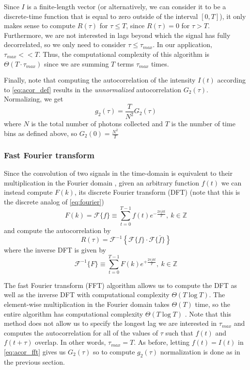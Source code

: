 Since $I$ is a finite-length vector (or alternatively, we can consider it to be a discrete-time function that is equal to zero outside of the interval $[0,T]$), it only makes sense to compute $R(\tau)$ for $\tau \leq T$, since $R(\tau) = 0$ for $\tau > T$. Furthermore, we are not interested in lags beyond which the signal has fully decorrelated, so we only need to consider $\tau \leq \tau_{max}$. In our application, $\tau_{max} << T$. Thus, the computational complexity of this algorithm is $\Theta(T\cdot\tau_{max})$ since we are summing $T$ terms $\tau_{max}$ times. 

Finally, note that computing the autocorrelation of the intensity $I(t)$ according to \autoref{eq:acor_def} results in the \emph{unnormalized} autocorrelation $G_2(\tau)$. Normalizing, we get 
\begin{equation}
g_2(\tau) = \frac{T}{N^2}G_2(\tau) 
\end{equation}
where $N$ is the total number of photons collected and $T$ is the number of time bins as defined above, so $G_2(0) = \frac{N^2}{T}$



\subsubsection{Fast Fourier transform}
Since the convolution of two signals in the time-domain is equivalent to their multiplication in the Fourier domain \cite{OW1997}, given an arbitrary function $f(t)$ we can instead compute $F(k)$, its discrete Fourier transform (DFT) (note that this is the discrete analog of \autoref{eq:fourier})
\begin{equation}
F(k) = \mathcal{F}\{f\} \equiv \sum_{t=0}^{T-1}f(t)e^{-\frac{2\pi j kt}{T}}, ~k\in\mathbb{Z}
\end{equation}
and compute the autocorrelation by
\begin{equation} \label{eq:acor_fft}
R(\tau) = \mathcal{F}^{-1}\left\lbrace \mathcal{F}\{f\} \cdot \mathcal{F}\{\bar{f}\} \right\rbrace
\end{equation}
where the inverse DFT is given by
\begin{equation}
\mathcal{F}^{-1} \{F\} \equiv \sum_{t=0}^{T-1}F(k)e^{+\frac{2\pi j kt}{T}}, ~k\in\mathbb{Z}
\end{equation}

The fast Fourier transform (FFT) algorithm allows us to compute the DFT as well as the inverse DFT with computational complexity $\Theta(T\log T)$. The element-wise multiplication in the Fourier domain takes $\Theta(T)$ time, so the entire algorithm has computational complexity $\Theta(T\log T)$ \cite[ch. 30]{CLRS2009}. Note that this method does not allow us to specify the longest lag we are interested in $\tau_{max}$ and computes the autocorrelation for all of the values of $\tau$ such that $f(t)$ and $f(t+\tau)$ overlap. In other words, $\tau_{max}=T$. As before, letting $f(t)=I(t)$ in \autoref{eq:acor_fft} gives us $G_2(\tau)$ so to compute $g_2(\tau)$ normalization is done as in the previous section. 

